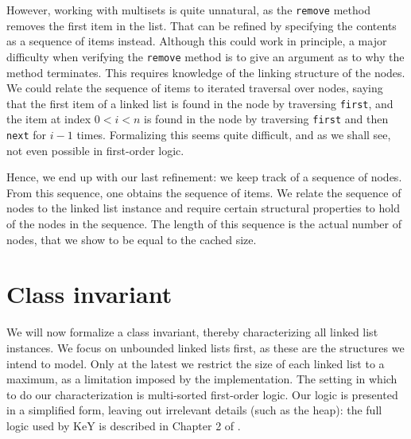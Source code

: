 \documentclass[runningheads]{llncs}
\begin{document}
However, working with multisets is quite unnatural, as the \texttt{remove} method removes the first item in the list. That can be refined by specifying the contents as a sequence of items instead. Although this could work in principle, a major difficulty when verifying the \texttt{remove} method is to give an argument as to why the method terminates. This requires knowledge of the linking structure of the nodes. We could relate the sequence of items to iterated traversal over nodes, saying that the first item of a linked list is found in the node by traversing \texttt{first}, and the item at index $0<i<n$ is found in the node by traversing \texttt{first} and then \texttt{next} for $i-1$ times. Formalizing this seems quite difficult, and as we shall see, not even possible in first-order logic.

Hence, we end up with our last refinement: we keep track of a sequence of nodes. From this sequence, one obtains the sequence of items. We relate the sequence of nodes to the linked list instance and require certain structural properties to hold of the nodes in the sequence. The length of this sequence is the actual number of nodes, that we show to be equal to the cached size.

%

\section{Class invariant}\label{sec:class-invariant}

We will now formalize a class invariant, thereby characterizing all linked list instances. We focus on unbounded linked lists first, as these are the structures we intend to model. Only at the latest we restrict the size of each linked list to a maximum, as a limitation imposed by the implementation. The setting in which to do our characterization is multi-sorted first-order logic. Our logic is presented in a simplified form, leaving out irrelevant details (such as the heap): the full logic used by KeY is described in Chapter 2 of \cite{KeYbook}.
\end{document}
